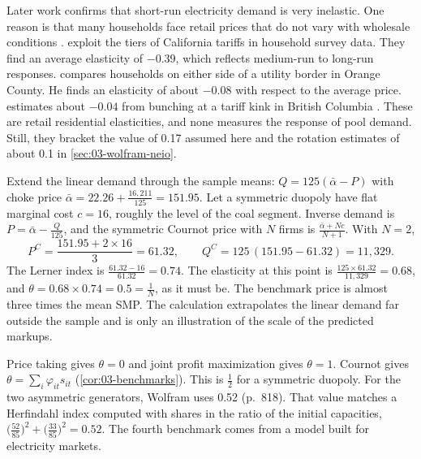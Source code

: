 Later work confirms that short-run electricity demand is very inelastic. One reason is that many households face
retail prices that do not vary with wholesale conditions \citep[p.~709]{KelloggReguant2021}. \citet{ReissWhite2005}
exploit the tiers of California tariffs in household survey data. They find an average elasticity of $-0.39$, which
reflects medium-run to long-run responses. \citet{Ito2014} compares households on either side of a utility border in
Orange County. He finds an elasticity of about $-0.08$ with respect to the average price. \citet{Shaffer2020} estimates
about $-0.04$ from bunching at a tariff kink in British Columbia \citep[pp.~710--711]{KelloggReguant2021}. These are
retail residential elasticities, and none measures the response of pool demand. Still, they bracket the value of 0.17
assumed here and the rotation estimates of about 0.1 in \cref{sec:03-wolfram-neio}.

\begin{example}\label{ex:03-wolfram-cournot}
Extend the linear demand through the sample means: $Q = 125(\bar\alpha - P)$ with choke price $\bar\alpha = 22.26 +
\frac{16{,}211}{125} = 151.95$. Let a symmetric duopoly have flat marginal cost $c = 16$, roughly the level of the coal
segment. Inverse demand is $P = \bar\alpha - \frac{Q}{125}$, and the symmetric Cournot price with $N$ firms is
$\frac{\bar\alpha + Nc}{N + 1}$. With $N = 2$,
\begin{equation*}
P^{C} = \frac{151.95 + 2 \times 16}{3} = 61.32,
\qquad
Q^{C} = 125\,(151.95 - 61.32) = 11{,}329.
\end{equation*}
The Lerner index is $\frac{61.32 - 16}{61.32} = 0.74$. The elasticity at this point is
$\frac{125 \times 61.32}{11{,}329} = 0.68$, and $\theta = 0.68 \times 0.74 = 0.5 = \frac{1}{N}$, as it must be. The
benchmark price is almost three times the mean SMP. The calculation extrapolates the linear demand far outside the
sample and is only an illustration of the scale of the predicted markups.
\end{example}

Price taking gives $\theta = 0$ and joint profit maximization gives $\theta = 1$. Cournot gives
$\theta = \sum_i \varphi_{it} s_{it}$ (\cref{cor:03-benchmarks}). This is $\frac{1}{2}$ for a symmetric duopoly. For the
two asymmetric generators, Wolfram uses 0.52 (p.~818). That value matches a Herfindahl index computed with shares in the
ratio of the initial capacities, $\bigl(\frac{52}{85}\bigr)^2 + \bigl(\frac{33}{85}\bigr)^2 = 0.52$. The fourth
benchmark comes from a model built for electricity markets.

